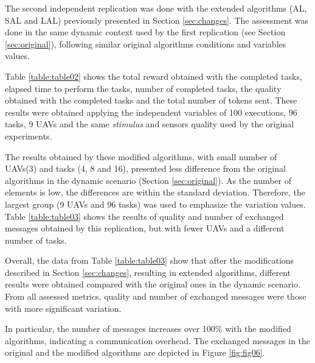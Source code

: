 The second independent replication was done with the extended algorithms (AL, SAL and LAL) previously presented in Section \ref{sec:changes}. The assessment was done in the same dynamic context used by the first replication (see Section \ref{sec:original}), following similar original algorithms conditions and variables values.

Table \ref{table:table02} shows the total reward obtained with the completed tasks, elapsed time to perform the tasks, number of completed tasks, the quality obtained with the completed tasks and the total number of tokens sent. These results were obtained applying the independent variables of 100 executions, 96 tasks, 9 UAVs and the same \textit{stimulus} and sensors quality used by the original experiments.



The results obtained by these modified algorithms, with small number of UAVs(3) and tasks (4, 8 and 16), presented less difference from the original algorithms in the dynamic scenario (Section \ref{sec:original}). As the number of elements is low, the differences are within the standard deviation. Therefore, the largest group (9 UAVs and 96 tasks) was used to emphasize the variation values. Table \ref{table:table03} shows the results of quality and number of exchanged messages obtained by this replication, but with fewer UAVs and a different number of tasks.



Overall, the data from Table \ref{table:table03} show that after the modifications described in Section \ref{sec:changes}, resulting in extended algorithms, different results were obtained  compared with the original ones in the dynamic scenario. From all assessed metrics, quality and number of exchanged messages were those with more significant variation.

In particular, the number of messages increases over 100\% with the modified algorithms, indicating a communication overhead. The exchanged messages in the original and the modified algorithms are depicted in Figure \ref{fig:fig06}.

